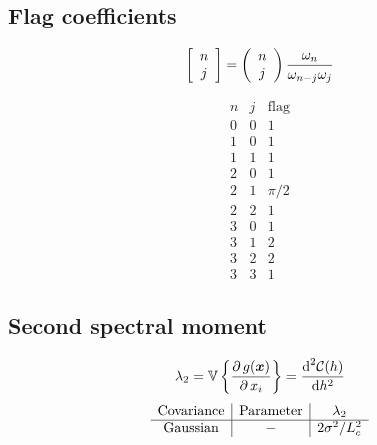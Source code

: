 \documentclass[12pt]{article}
\begin{document}
\subsection{Flag coefficients}
\begin{minipage}{0.5\linewidth}
\begin{equation}
  \left[ \begin{array}{c} n \\ j \end{array} \right] = 
  \left( \begin{array}{c} n \\ j \end{array} \right)\frac{\omega_n}{\omega_{n-j}\omega_j}
\end{equation}
\end{minipage}
\begin{minipage}{0.5\linewidth}
\begin{equation}
  \begin{array}{c|c|c}
    n & j & \text{flag} \\
    \hline
    0 & 0 & 1\\
    1 & 0 & 1\\
    1 & 1 & 1\\
    2 & 0 & 1\\
    2 & 1 & \pi/2\\
    2 & 2 & 1\\
    3 & 0 & 1\\
    3 & 1 & 2\\
    3 & 2 & 2\\
    3 & 3 & 1
  \end{array}
\end{equation}
\end{minipage}

\subsection{Second spectral moment}
\begin{equation}
  \lambda_2=\mathbb{V}\left\{\frac{\partial\, g(\boldsymbol{x})}{\partial\, x_i}\right\}= \frac{\text{d}^2\mathcal{C}(h)}{\text{d}h^2}
\end{equation}
\begin{equation}
  \begin{array}{c|c|c}
    \text{Covariance} & \text{Parameter} & \lambda_2 \\
    \hline
    \text{Gaussian} & - & 2\sigma^2/L_c^2\\
  \end{array}
\end{equation}
\end{document}
